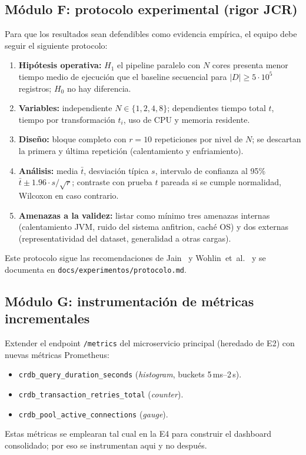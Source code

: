 \documentclass[11pt,a4paper]{article}
\begin{document}
\subsection{Módulo F: protocolo experimental (rigor JCR)}

    Para que los resultados sean defendibles como evidencia empírica, el equipo debe seguir el siguiente protocolo:
    \begin{enumerate}
        \item \textbf{Hipótesis operativa:} $H_1$ el pipeline paralelo con $N$ cores presenta menor tiempo medio de ejecución que el baseline secuencial para $|D|\ge 5\cdot 10^5$ registros; $H_0$ no hay diferencia.
        \item \textbf{Variables:} independiente $N\in\{1,2,4,8\}$; dependientes tiempo total $t$, tiempo por transformación $t_i$, uso de CPU y memoria residente.
        \item \textbf{Diseño:} bloque completo con $r=10$ repeticiones por nivel de $N$; se descartan la primera y última repetición (calentamiento y enfriamiento).
        \item \textbf{Análisis:} media $\bar{t}$, desviación típica $s$, intervalo de confianza al 95\% $\bar{t}\pm 1.96\cdot s/\sqrt{r}$; contraste con prueba $t$ pareada si se cumple normalidad, Wilcoxon en caso contrario.
        \item \textbf{Amenazas a la validez:} listar como mínimo tres amenazas internas (calentamiento JVM, ruido del sistema anfitrion, caché OS) y dos externas (representatividad del dataset, generalidad a otras cargas).
    \end{enumerate}
    Este protocolo sigue las recomendaciones de Jain~\cite{Jain1991Perf} y Wohlin~et~al.~\cite{Wohlin2012Experimentation} y se documenta en \texttt{docs/experimentos/protocolo.md}.

\subsection{Módulo G: instrumentación de métricas incrementales}

    Extender el endpoint \texttt{/metrics} del microservicio principal (heredado de E2) con nuevas métricas Prometheus:
    \begin{itemize}
        \item \texttt{crdb\_query\_duration\_seconds} (\textit{histogram}, buckets 5\,ms--2\,s).
        \item \texttt{crdb\_transaction\_retries\_total} (\textit{counter}).
        \item \texttt{crdb\_pool\_active\_connections} (\textit{gauge}).
    \end{itemize}
    Estas métricas se emplearan tal cual en la E4 para construir el dashboard consolidado; por eso se instrumentan aqui y no después.
\end{document}
